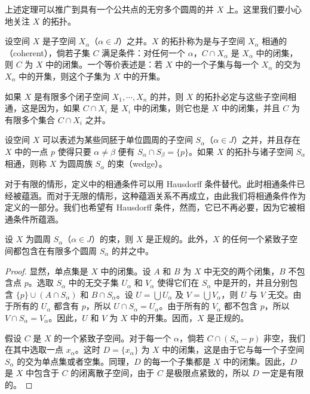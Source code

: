 \documentclass[../../main.tex]{subfiles}
\begin{document}
上述定理可以推广到具有一个公共点的无穷多个圆周的并 $X$ 上。这里我们要小心地关注 $X$ 的拓扑。

\begin{definition}[相通拓扑]\label{definition:ch11-coherent-topology}
设空间 $X$ 是子空间 $X_\alpha$（$\alpha\in J$）之并。$X$ 的拓扑称为是与子空间 $X_\alpha$ 相通的（coherent），倘若子集 $C$ 满足条件：对任何一个 $\alpha$，$C\cap X_\alpha$ 是 $X_\alpha$ 中的闭集，则 $C$ 为 $X$ 中的闭集。一个等价表述是：若 $X$ 中的一个子集与每一个 $X_\alpha$ 的交为 $X_\alpha$ 中的开集，则这个子集为 $X$ 中的开集。
\end{definition}

如果 $X$ 是有限多个闭子空间 $X_1,\cdots,X_n$ 的并，则 $X$ 的拓扑必定与这些子空间相通，这是因为，如果 $C\cap X_i$ 是 $X_i$ 中的闭集，则它也是 $X$ 中的闭集，并且 $C$ 为有限多个集合 $C\cap X_i$ 之并。

\begin{definition}[圆周族的束]\label{definition:ch11-infinite-wedge}
设空间 $X$ 可以表述为某些同胚于单位圆周的子空间 $S_\alpha$（$\alpha\in J$）之并，并且存在 $X$ 中的一点 $p$ 使得只要 $\alpha\neq\beta$ 便有 $S_\alpha\cap S_\beta=\{p\}$。如果 $X$ 的拓扑与诸子空间 $S_\alpha$ 相通，则称 $X$ 为圆周族 $S_\alpha$ 的束（wedge）。
\end{definition}

对于有限的情形，定义中的相通条件可以用 Hausdorff 条件替代。此时相通条件已经被蕴涵。而对于无限的情形，这种蕴涵关系不再成立，由此我们将相通条件作为定义的一部分。我们也希望有 Hausdorff 条件，然而，它已不再必要，因为它被相通条件所蕴涵。

\begin{lemma}\label{lemma:ch11-wedge-regular}
设 $X$ 为圆周 $S_\alpha$（$\alpha\in J$）的束，则 $X$ 是正规的。此外，$X$ 的任何一个紧致子空间都包含在有限多个圆周 $S_\alpha$ 的并之中。
\end{lemma}

\begin{proof}
显然，单点集是 $X$ 中的闭集。设 $A$ 和 $B$ 为 $X$ 中无交的两个闭集，$B$ 不包含点 $p$。选取 $S_\alpha$ 中的无交子集 $U_\alpha$ 和 $V_\alpha$ 使得它们在 $S_\alpha$ 中是开的，并且分别包含 $\{p\}\cup(A\cap S_\alpha)$ 和 $B\cap S_\alpha$。设 $U=\bigcup U_\alpha$ 及 $V=\bigcup V_\alpha$，则 $U$ 与 $V$ 无交。由于所有的 $U_\alpha$ 都含有 $p$，所以 $U\cap S_\alpha=U_\alpha$。由于所有的 $V_\alpha$ 都不包含 $p$，所以 $V\cap S_\alpha=V_\alpha$。因此，$U$ 和 $V$ 为 $X$ 中的开集。因而，$X$ 是正规的。

假设 $C$ 是 $X$ 的一个紧致子空间。对于每一个 $\alpha$，倘若 $C\cap(S_\alpha-p)$ 非空，我们在其中选取一点 $x_\alpha$。这时 $D=\{x_\alpha\}$ 为 $X$ 中的闭集，这是由于它与每一个子空间 $S_\alpha$ 的交为单点集或者空集。同理，$D$ 的每一个子集都是 $X$ 中的闭集。因此，$D$ 是 $X$ 中包含于 $C$ 的闭离散子空间，由于 $C$ 是极限点紧致的，所以 $D$ 一定是有限的。
\end{proof}
\end{document}
